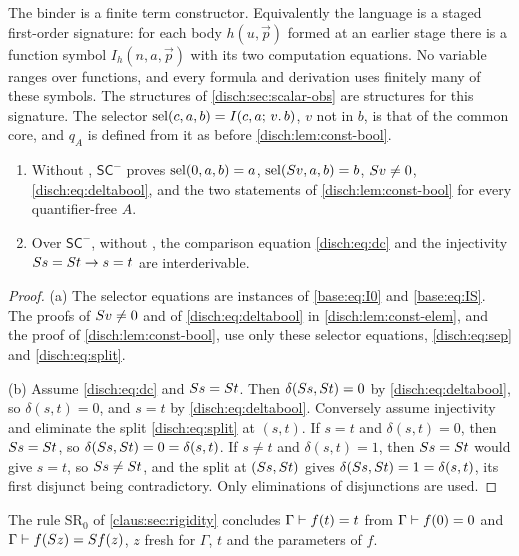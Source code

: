 The binder is a finite term constructor. Equivalently the language is a
staged first-order signature: for each body $h(u,\vec p)$ formed at an
earlier stage there is a function symbol $I_h(n,a,\vec p)$ with its two
computation equations. No variable ranges over functions, and every formula
and derivation uses finitely many of these symbols. The structures of
\cref{disch:sec:scalar-obs} are structures for this signature. The selector
$\operatorname{sel}(c,a,b)=I(c,a;\,v.\,b)$, $v$ not in $b$, is that of the common core,
and $q_A$ is defined from it as before \cref{disch:lem:const-bool}.

\begin{lemma}
\label{disch:lem:sc-elem}
\begin{enumerate}[label=\textup{(\alph*)}]
\item Without , $\mathsf{SC}^{-}$ proves $\operatorname{sel}(0,a,b)=a$,
 $\operatorname{sel}(S v,a,b)=b$, $S v\neq 0$, \eqref{disch:eq:deltabool}, and the
 two statements of \cref{disch:lem:const-bool} for every quantifier-free
 $A$.
\item Over $\mathsf{SC}^{-}$, without , the comparison
 equation \eqref{disch:eq:dc} and the injectivity
 $S s=S t\to s=t$ are interderivable.
\end{enumerate}
\end{lemma}

\begin{proof}
(a) The selector equations are instances of \eqref{base:eq:I0} and
\eqref{base:eq:IS}. The proofs of $S v\neq 0$ and of
\eqref{disch:eq:deltabool} in \cref{disch:lem:const-elem}, and the proof of
\cref{disch:lem:const-bool}, use only these selector equations,
\eqref{disch:eq:sep} and \eqref{disch:eq:split}.

(b) Assume \eqref{disch:eq:dc} and $S s=S t$. Then
$\delta(S s,S t)=0$ by \eqref{disch:eq:deltabool}, so
$\delta(s,t)=0$, and $s=t$ by \eqref{disch:eq:deltabool}. Conversely assume
injectivity and eliminate the split \eqref{disch:eq:split} at $(s,t)$. If
$s=t$ and $\delta(s,t)=0$, then $S s=S t$, so
$\delta(S s,S t)=0=\delta(s,t)$. If $s\neq t$ and $\delta(s,t)=1$,
then $S s=S t$ would give $s=t$, so $S s\neq S t$, and the split at
$(S s,S t)$ gives $\delta(S s,S t)=1=\delta(s,t)$, its first
disjunct being contradictory. Only eliminations of disjunctions are used.
\end{proof}

The rule $\mathrm{SR}_0$ of \cref{claus:sec:rigidity} concludes
$\Gamma\vdash f(t)=t$ from $\Gamma\vdash f(0)=0$ and
$\Gamma\vdash f(S z)=S f(z)$, $z$ fresh for $\Gamma$, $t$ and the
parameters of $f$.

